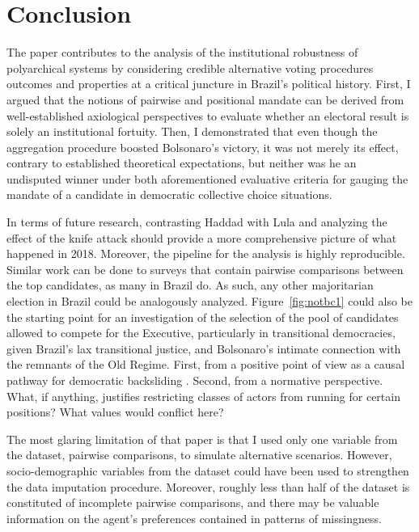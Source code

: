 \documentclass[hidelinks,11pt]{article}
\begin{document}
\section{Conclusion}

The paper contributes to the analysis of the institutional robustness of
polyarchical systems by considering credible alternative voting procedures
outcomes and properties at a critical juncture in Brazil's political history.
First, I argued that the notions of pairwise and positional mandate can be
derived from well-established axiological perspectives to evaluate whether an
electoral result is solely an institutional fortuity. Then, I demonstrated that
even though the aggregation procedure boosted Bolsonaro's victory, it was not
merely its effect, contrary to established theoretical expectations, but neither
was he an undisputed winner under both aforementioned evaluative criteria for
gauging the mandate of a candidate in democratic collective choice situations.

In terms of future research, contrasting Haddad with Lula and analyzing the
effect of the knife attack should provide a more comprehensive picture of what
happened in 2018. Moreover, the pipeline for the analysis is highly
reproducible. Similar work can be done to surveys that contain pairwise
comparisons between the top candidates, as many in Brazil do. As such, any other
majoritarian election in Brazil could be analogously analyzed.
Figure~\ref{fig:notbc1} could also be the starting point for an investigation of
the selection of the pool of candidates allowed to compete for the Executive,
particularly in transitional democracies, given Brazil's lax transitional
justice, and Bolsonaro's intimate connection with the remnants of the Old
Regime. First, from a positive point of view as a causal pathway for democratic
backsliding \parencite{svolik2008authoritarian, nalepa2022after}. Second, from a
normative perspective. What, if anything, justifies restricting classes of
actors from running for certain positions? What values would conflict here?

The most glaring limitation of that paper is that I used only one variable from
the dataset, pairwise comparisons, to simulate alternative scenarios. However,
socio-demographic variables from the dataset could have been used to strengthen
the data imputation procedure. Moreover, roughly less than half of the dataset
is constituted of incomplete pairwise comparisons, and there may be valuable
information on the agent's preferences contained in patterns of missingness.
\end{document}
